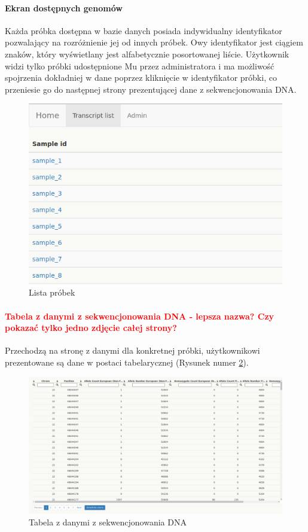 \documentclass[a4paper,12pt,twoside]{article}
\begin{document}
\paragraph{Ekran dostępnych genomów}
Każda próbka dostępna w bazie danych posiada indywidualny identyfikator pozwalający na 
rozróżnienie jej od innych próbek. Owy identyfikator jest ciągiem znaków, który wyświetlany jest 
alfabetycznie posortowanej liście. Użytkownik widzi tylko próbki udostępnione Mu przez administratora
i ma możliwość spojrzenia dokładniej w dane poprzez kliknięcie w identyfikator próbki,
co przeniesie go do następnej strony prezentującej dane z sekwencjonowania DNA. 


\begin{figure}[h!]
  \includegraphics[width=\linewidth]{obrazy/aplikacja/sample_list.png}
  \caption{Lista próbek}
  \label{fig:sample_listpic}
\end{figure}

\newpage
\paragraph{\textcolor{red}{
Tabela z danymi z sekwencjonowania DNA - lepsza nazwa? Czy pokazać tylko jedno zdjęcie całej strony?}
}
Przechodzą na stronę z danymi dla konkretnej próbki, użytkownikowi prezentowane są 
dane w postaci tabelarycznej (Rysunek numer \ref{fig:table1pic}).

\begin{figure}[h!]
  \includegraphics[width=\linewidth]{obrazy/aplikacja/table1.png}
  \caption{Tabela z danymi z sekwencjonowania DNA}
  \label{fig:table1pic}
\end{figure}
\end{document}
